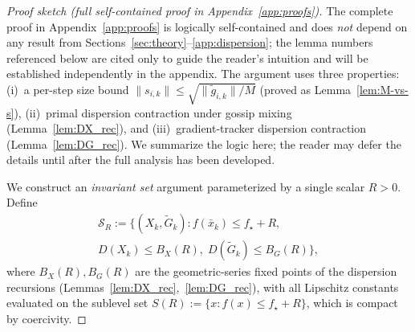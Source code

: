 \documentclass[11pt,a4paper]{article}
\begin{document}
	\begin{proof}[Proof sketch (full self-contained proof in Appendix~\ref{app:proofs})]
	The complete proof in Appendix~\ref{app:proofs} is logically
	self-contained and does \emph{not} depend on any result from
	Sections~\ref{sec:theory}--\ref{app:dispersion}; the lemma
	numbers referenced below are cited only to guide the reader's
	intuition and will be established independently in the appendix.
	The argument uses three properties: (i)~a per-step size bound
	$\|s_{i,k}\|\le\sqrt{\|\tilde g_{i,k}\|/M}$ (proved as
	Lemma~\ref{lem:M-vs-s}), (ii)~primal dispersion contraction
	under gossip mixing (Lemma~\ref{lem:DX_rec}), and
	(iii)~gradient-tracker dispersion contraction
	(Lemma~\ref{lem:DG_rec}).
	We summarize the logic here; the reader may defer the details
	until after the full analysis has been developed.

	We construct an \emph{invariant set} argument parameterized by
	a single scalar $R>0$.
	Define
	\begin{multline*}
	  \mathcal S_R := \bigl\{(X_k,\tilde G_k) :
	  f(\bar x_k)\le f_\star+R,\\
	  D(X_k)\le B_X(R),\;
	  D(\tilde G_k)\le B_G(R)\bigr\},
	\end{multline*}
	where $B_X(R),B_G(R)$ are the geometric-series fixed points of the
	dispersion recursions (Lemmas~\ref{lem:DX_rec},~\ref{lem:DG_rec}),
	with all Lipschitz constants evaluated on the sublevel set
	$S(R):=\{x:f(x)\le f_\star+R\}$, which is compact by coercivity.


\end{proof}
\end{document}
